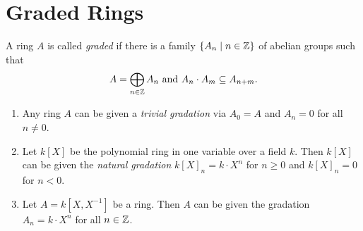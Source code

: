 \section{Graded Rings}

\begin{definition}
    A ring $A$ is called \textit{graded} if there is a family $\{A_n \;\vert\; n \in {\mathbb Z}\}$ of abelian groups such that $$A=\bigoplus_{n\in{\mathbb Z}} A_n \text{ and } A_n\cdot A_m \subseteq A_{n+m}.$$
\end{definition}

\begin{example}
    \begin{enumerate}[label=(\roman*)]
        \item Any ring $A$ can be given a \textit{trivial gradation} via $A_0=A$ and $A_n=0$ for all $n\neq0$.
        
        \item Let $k[X]$ be the polynomial ring in one variable over a field $k$.
        Then $k[X]$ can be given the \textit{natural gradation} $k[X]_n=k\cdot X^n$ for $n\geq 0$ and $k[X]_n=0$ for $n<0$.

        \item Let $A=k[X,X^{-1}]$ be a ring.
        Then $A$ can be given the gradation $A_n=k\cdot X^n$ for all $n\in{\mathbb Z}$.
    \end{enumerate}
\end{example}